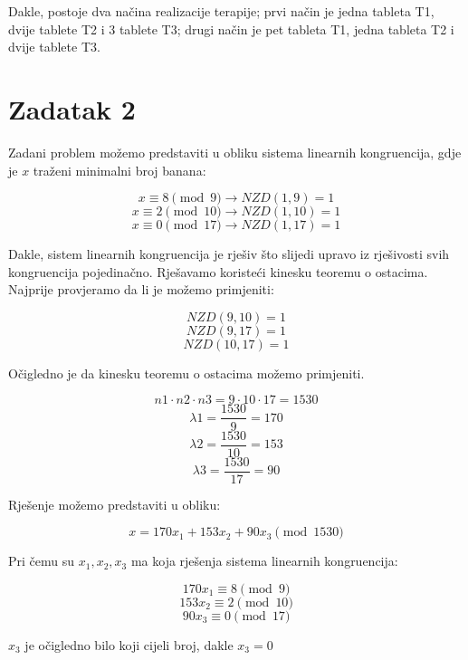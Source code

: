 \documentclass[12pt]{article}
\begin{document}
Dakle, postoje dva načina realizacije terapije; prvi način je jedna tableta T1, dvije tablete T2 i 3 tablete T3; drugi način je pet tableta T1, jedna tableta T2 i dvije tablete T3.

\section*{Zadatak 2\label{Z2}}

\hspace{0.65cm}Zadani problem možemo predstaviti u obliku sistema linearnih kongruencija, gdje je $x$ traženi minimalni broj banana:

$$x \equiv 8 \pmod{9} \to NZD(1, 9) = 1$$
$$x \equiv 2 \pmod{10} \to NZD(1, 10) = 1$$
$$x \equiv 0 \pmod{17} \to NZD(1, 17) = 1$$\vspace{1mm}

Dakle, sistem linearnih kongruencija je rješiv što slijedi upravo iz rješivosti svih kongruencija pojedinačno. Rješavamo koristeći kinesku teoremu o ostacima. Najprije provjeramo da li je možemo primjeniti: 

$$NZD(9, 10) = 1$$
$$NZD(9, 17) = 1$$
$$NZD(10, 17) = 1$$\vspace{1mm}

Očigledno je da kinesku teoremu o ostacima možemo primjeniti.

$$n1 \cdot n2 \cdot n3 = 9 \cdot 10 \cdot 17 = 1530$$\vspace{1mm}
$$\lambda 1 = \frac{1530}{9} = 170$$\vspace{1mm}
$$\lambda 2 = \frac{1530}{10} = 153$$\vspace{1mm}
$$\lambda 3 = \frac{1530}{17} = 90$$\vspace{1mm}

Rješenje možemo predstaviti u obliku:

$$x = 170x_{1} + 153x_{2} + 90x_{3} \pmod{1530}$$\vspace{1mm}

Pri čemu su $x_{1}, x_{2}, x_{3}$ ma koja rješenja sistema linearnih kongruencija:

\[
170x_{1} \equiv 8 \pmod{9} \label{eq:kong1} \tag{A}
\]
\[
153x_{2} \equiv 2 \pmod{10} \label{eq:kong2} \tag{B}
\]
$$90x_{3} \equiv 0 \pmod{17}$$

\begin{center}
$x_{3}$ je očigledno bilo koji cijeli broj, dakle $x_{3} = 0$
\end{center}\vspace{1mm}
\end{document}
